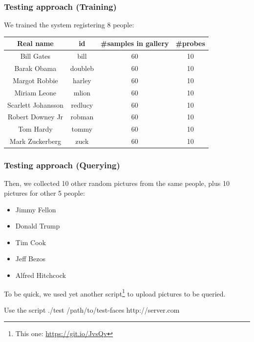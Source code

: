 \begin{frame} \frametitle{Testing approach (Training)}

	We trained the system registering 8 people:
	
	\begin{center}
 		\begin{tabular}{||c | c | c | c||} 
			 \hline
			 	\textbf{Real name} & 
			 	\textbf{id} & 
			 	\textbf{\#samples in gallery} & 
			 	\textbf{\#probes} 
			 \\ [0.5ex] 
			 \hline\hline
			 	Bill Gates & 
			 	bill & 
			 	60 & 
			 	10 
			 \\ 
			 \hline
			 	Barak Obama & 
			 	doubleb & 
			 	60 & 
			 	10 
			 \\
			 \hline
			 	Margot Robbie & 
				harley & 
			 	60 & 
			 	10 
			 \\
			 \hline
			 	Miriam Leone & 
			 	mlion & 
			 	60 & 
			 	10 
			 \\
			 \hline
			 	Scarlett Johansson & 
			 	redlucy & 
			 	60 & 
			 	10 
			\\
			 \hline
			 	Robert Downey Jr & 
				robman & 
			 	60 & 
			 	10 
			 \\
			 \hline
			 	Tom Hardy & 
			 	tommy & 
			 	60 & 
			 	10
			\\
			 \hline
			 	Mark Zuckerberg & 
			 	zuck & 
			 	60 & 
			 	10
			\\ [1ex] 
 			\hline
		\end{tabular}
	\end{center}	

\end{frame}

\begin{frame} \frametitle{Testing approach (Querying)}
	
	Then, we collected 10 other random pictures from the same 
	people, plus 10 pictures for other 5 people:
	
	\begin{itemize}
		\item Jimmy Fellon
		\item Donald Trump
		\item Tim Cook
		\item Jeff Bezos
		\item Alfred Hitchcock
	\end{itemize}
	
	To be quick, we used yet another script\footnote{This one: {\color{red} \url{https://git.io/JvsQv}}} to upload
	pictures to be queried. 
	
	\begin{block}{Use the script}
		./test /path/to/test-faces http://server.com
	\end{block}

\end{frame}

